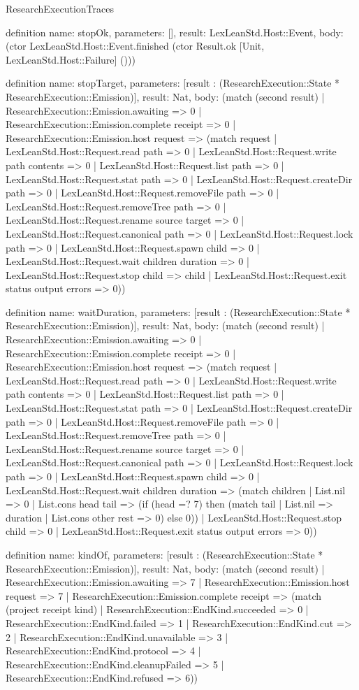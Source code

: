 \begin{lexlean}{ResearchExecutionTraces}
\begin{semanticmodule}
definition{
  name: stopOk,
  parameters: [],
  result: LexLeanStd.Host::Event,
  body: (ctor LexLeanStd.Host::Event.finished (ctor Result.ok [Unit, LexLeanStd.Host::Failure] ()))
}

definition{
  name: stopTarget,
  parameters: [result : (ResearchExecution::State * ResearchExecution::Emission)],
  result: Nat,
  body: (match (second result) | ResearchExecution::Emission.awaiting => 0 | ResearchExecution::Emission.complete receipt => 0 | ResearchExecution::Emission.host request => (match request
    | LexLeanStd.Host::Request.read path => 0
    | LexLeanStd.Host::Request.write path contents => 0
    | LexLeanStd.Host::Request.list path => 0
    | LexLeanStd.Host::Request.stat path => 0
    | LexLeanStd.Host::Request.createDir path => 0
    | LexLeanStd.Host::Request.removeFile path => 0
    | LexLeanStd.Host::Request.removeTree path => 0
    | LexLeanStd.Host::Request.rename source target => 0
    | LexLeanStd.Host::Request.canonical path => 0
    | LexLeanStd.Host::Request.lock path => 0
    | LexLeanStd.Host::Request.spawn child => 0
    | LexLeanStd.Host::Request.wait children duration => 0
    | LexLeanStd.Host::Request.stop child => child
    | LexLeanStd.Host::Request.exit status output errors => 0))
}

definition{
  name: waitDuration,
  parameters: [result : (ResearchExecution::State * ResearchExecution::Emission)],
  result: Nat,
  body: (match (second result) | ResearchExecution::Emission.awaiting => 0 | ResearchExecution::Emission.complete receipt => 0 | ResearchExecution::Emission.host request => (match request
    | LexLeanStd.Host::Request.read path => 0
    | LexLeanStd.Host::Request.write path contents => 0
    | LexLeanStd.Host::Request.list path => 0
    | LexLeanStd.Host::Request.stat path => 0
    | LexLeanStd.Host::Request.createDir path => 0
    | LexLeanStd.Host::Request.removeFile path => 0
    | LexLeanStd.Host::Request.removeTree path => 0
    | LexLeanStd.Host::Request.rename source target => 0
    | LexLeanStd.Host::Request.canonical path => 0
    | LexLeanStd.Host::Request.lock path => 0
    | LexLeanStd.Host::Request.spawn child => 0
    | LexLeanStd.Host::Request.wait children duration => (match children | List.nil => 0 | List.cons head tail => (if (head =? 7) then (match tail | List.nil => duration | List.cons other rest => 0) else 0))
    | LexLeanStd.Host::Request.stop child => 0
    | LexLeanStd.Host::Request.exit status output errors => 0))
}

definition{
  name: kindOf,
  parameters: [result : (ResearchExecution::State * ResearchExecution::Emission)],
  result: Nat,
  body: (match (second result) | ResearchExecution::Emission.awaiting => 7 | ResearchExecution::Emission.host request => 7 | ResearchExecution::Emission.complete receipt => (match (project receipt kind) | ResearchExecution::EndKind.succeeded => 0 | ResearchExecution::EndKind.failed => 1 | ResearchExecution::EndKind.cut => 2 | ResearchExecution::EndKind.unavailable => 3 | ResearchExecution::EndKind.protocol => 4 | ResearchExecution::EndKind.cleanupFailed => 5 | ResearchExecution::EndKind.refused => 6))
}


\end{semanticmodule}
\end{lexlean}
